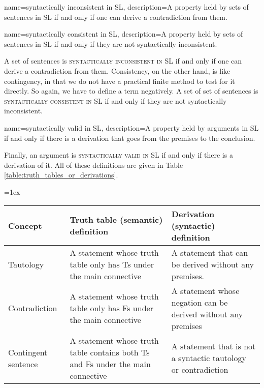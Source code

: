 {
{
name=syntactically inconsistent in SL,
description={A property held by sets of sentences in SL if and only if one can derive a contradiction from them.}
}

{
name=syntactically consistent in SL,
description={A property held by sets of sentences in SL if and only if they are not syntactically inconsistent.}
}

A set of sentences is \textsc{\gls{syntactically inconsistent in SL}} \label{def:syntactically_inconsistent_ in_sl} if and only if one can derive a contradiction from them. Consistency, on the other hand, is like contingency, in that we do not have a practical finite method to test for it directly. So again, we have to define a term negatively. A set of set of sentences is \textsc{\gls{syntactically consistent in SL}} \label{def:syntactically consistent in SL} if and only if they are not syntactically inconsistent.
    
{
name=syntactically valid in SL,
description={A property held by arguments in SL if and only if there is a derivation that goes from the premises to the conclusion.}
}

Finally, an argument is \textsc{\gls{syntactically valid in SL}} \label{def:syntactically_valid_in_SL} if and only if there is a derivation of it. All of these definitions are given in Table \ref{table:truth_tables_or_derivations}.


\begin{sidewaystable}
\begin{mdframed}[style=mytablebox]
\tabulinesep=1ex
\begin{tabu}{X[.5,c,m] ||X[1,l,m] |X[1,l,m]}
\bf{Concept} 		&	\bf{Truth table (semantic) definition} 	&	\bf{Derivation (syntactic) definition} \\ \hline \hline

Tautology  &	A statement whose truth table only has Ts under the main connective & A statement that can be derived without any premises.	 \\ \hline
 
Contradiction		&	A statement whose truth table only has Fs under the main connective  &	A statement whose negation can be derived without any premises\\ \hline

Contingent sentence	&	A statement whose truth table contains both Ts and Fs under the main connective & A statement that is not a syntactic tautology or contradiction \\ \hline


\end{tabu}
\end{mdframed}
\end{sidewaystable}}
